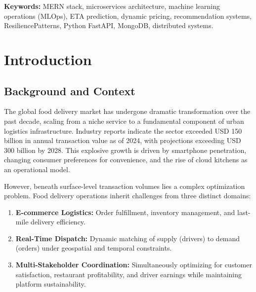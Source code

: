 \documentclass[12pt,a4paper]{report}
\begin{document}
\vspace{0.4cm}
\noindent \textbf{Keywords:} MERN stack, microservices architecture, machine learning operations (MLOps), ETA prediction, dynamic pricing, recommendation systems, ResiliencePatterns, Python FastAPI, MongoDB, distributed systems.

\tableofcontents
\clearpage
\listoftables
\clearpage
\listoffigures
\clearpage

\chapter{Introduction}

\section{Background and Context}

The global food delivery market has undergone dramatic transformation over the past decade, scaling from a niche service to a fundamental component of urban logistics infrastructure. Industry reports indicate the sector exceeded USD 150 billion in annual transaction value as of 2024, with projections exceeding USD 300 billion by 2028. This explosive growth is driven by smartphone penetration, changing consumer preferences for convenience, and the rise of cloud kitchens as an operational model.

However, beneath surface-level transaction volumes lies a complex optimization problem. Food delivery operations inherit challenges from three distinct domains:

\begin{enumerate}
    \item \textbf{E-commerce Logistics:} Order fulfillment, inventory management, and last-mile delivery efficiency.
    \item \textbf{Real-Time Dispatch:} Dynamic matching of supply (drivers) to demand (orders) under geospatial and temporal constraints.
    \item \textbf{Multi-Stakeholder Coordination:} Simultaneously optimizing for customer satisfaction, restaurant profitability, and driver earnings while maintaining platform sustainability.
\end{enumerate}
\end{document}
